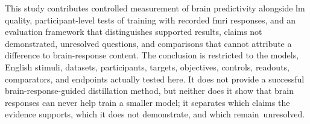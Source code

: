 This study contributes controlled measurement of brain predictivity alongside \ac{lm} quality, participant-level tests of training with recorded \ac{fmri} responses, and an evaluation framework that distinguishes supported results, claims not demonstrated, unresolved questions, and comparisons that cannot attribute a difference to brain-response content.
The conclusion is restricted to the models, English stimuli, datasets, participants, targets, objectives, controls, readouts, comparators, and endpoints actually tested here.
It does not provide a successful brain-response-guided distillation method, but neither does it show that brain responses can never help train a smaller model; it separates which claims the evidence supports, which it does not demonstrate, and which remain~unresolved.
